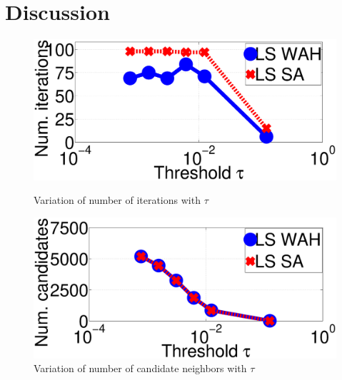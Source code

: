 \section{Discussion}
\label{sec:Discussion}
\begin{figure}[t!]
\centering
\centering
  \includegraphics[width=0.65\linewidth]{TagTree/RebuttalNIterationsWithTauNew} 
  \caption{Variation of number of iterations with $\tau$}
  \label{fig:TauNIterations}
  \includegraphics[width=0.65\linewidth]{TagTree/RebuttalNCandidatesWithTauNew}
  \caption{Variation of number of candidate neighbors with $\tau$}
  \label{fig:TauNCandidate}
\end{figure} 


